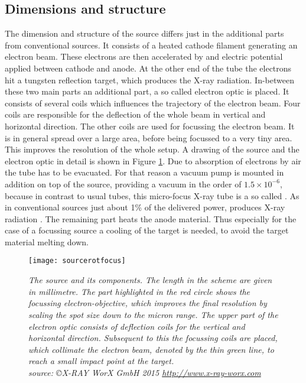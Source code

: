 \subsection{Dimensions and structure}\label{subsec:dimstruc}
The dimension and structure of the source differs just in the additional parts from conventional sources. It consists of a heated cathode filament generating an electron beam. These electrons are then accelerated by and electric potential applied between cathode and anode. At the other end of the tube the electrons hit a tungsten reflection target, which produces the X-ray radiation. In-between these two main parts an additional part, a so called electron optic is placed. It consists of several coils which influences the trajectory of the electron beam. Four coils are responsible for the deflection of the whole beam in vertical and horizontal direction. The other coils are used for focussing the electron beam. It is in general spread over a large area, before being focussed to a very tiny area. This improves the resolution of the whole setup. A drawing of the source and the electron optic in detail is shown in Figure \ref{sourcerotfoc}. Due to absorption of electrons by air the tube has to be evacuated. For that reason a vacuum pump is mounted in addition on top of the source, providing a vacuum in the order of $1.5 \times 10^{-6} $, because in contrast to usual tubes, this micro-focus X-ray tube is a so called .  
As in conventional sources just about 1\% of the delivered power, produces X-ray radiation \citep{Lehnertz}. The remaining part heats the anode material. Thus especially for the case of a focussing source a cooling of the target is needed, to avoid the target material melting down.      
\begin{figure}[h]
	\begin{center}
		\texttt{[image: sourcerotfocus]}
	\end{center}
	\caption[Dimensions of the source with focussing system]{\textit{The source and its components. The length in the scheme are given in millimetre. The part highlighted in the red circle shows the focussing electron-objective, which improves the final resolution by scaling the spot size down to the micron range. The upper part of the electron optic consists of deflection coils for the vertical and horizontal direction. Subsequent to this the focussing coils are placed, which collimate the electron beam, denoted by the thin green line, to reach a small impact point at the target. \\source: \copyright X-RAY WorX GmbH 2015 \url{http://www.x-ray-worx.com}}}
	\label{sourcerotfoc}
\end{figure}
